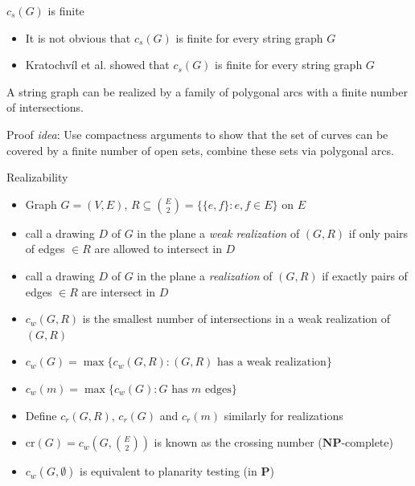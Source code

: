 \documentclass[10pt,aspectratio=169]{beamer}
\theoremstyle{plain}
\newcommand{\set}[1]{\{#1\}}
\begin{document}
\begin{frame}{\(c_s(G)\) is finite}
    \begin{itemize}
        \item It is not obvious that \(c_s(G)\) is finite for every string graph \(G\)
        \item Kratochvíl et al. showed that \(c_s(G)\) is finite for every string graph \(G\)
    \end{itemize}
    \begin{lemma}
        A string graph can be realized by a family of polygonal arcs with a finite number of intersections.
        \label{lem:finite-cs}
    \end{lemma}
    \pause
    Proof \textit{idea}: Use compactness arguments to show that the set of curves can be covered by a finite number of open sets, combine these sets via polygonal arcs.
\end{frame}

\begin{frame}{Realizability}
    \begin{itemize}
        \item Graph \(G = (V, E)\), \(R \subseteq \binom{E}{2} = \set{\set{e, f} : e, f \in E} \) on \(E\)
        \item call a drawing \(D\) of \(G\) in the plane a \textit{weak realization} of \((G, R)\) if only pairs of edges \(\in R\) are allowed to intersect in \(D\)
        \item call a drawing \(D\) of \(G\) in the plane a \textit{realization} of \((G, R)\) if exactly pairs of edges \(\in R\) are intersect in \(D\)
        \pause
        \item \(c_w(G, R)\) is the smallest number of intersections in a weak realization of \((G, R)\)
        \item \(c_w(G) = \max\set{c_w(G, R) : (G, R) \text{ has a weak realization}} \)
        \item \(c_w(m) = \max\set{c_w(G) : G \text{ has } m \text{ edges}}\)
        \item Define \(c_r(G, R)\), \(c_r(G)\) and \(c_r(m)\) similarly for realizations
        \pause
        \item \(\mathrm{cr}(G) = c_w(G, \binom{E}{2})\) is known as the crossing number (\(\mathbf{NP}\)-complete)
        \item \(c_w(G, \emptyset)\) is equivalent to planarity testing (in \(\mathbf{P}\))
    \end{itemize}
\end{frame}
\end{document}
